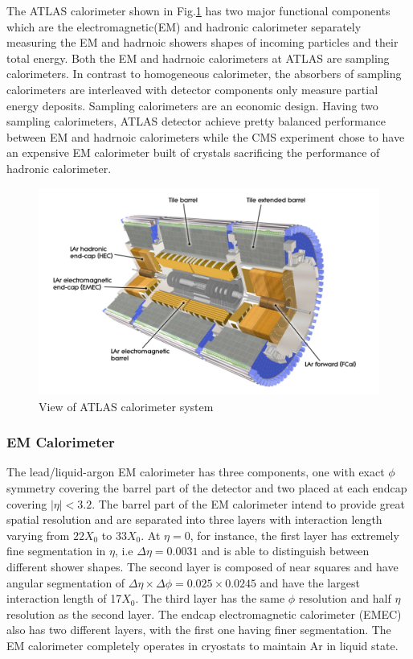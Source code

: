 \label{sec:detector-calo}

The ATLAS calorimeter shown in Fig.\ref{fig:detector-calo} has two major functional components which are the electromagnetic(EM) and hadronic calorimeter separately measuring the EM and hadrnoic showers shapes of incoming particles and their total energy. Both the EM and hadrnoic calorimeters at ATLAS are sampling calorimeters. In contrast to homogeneous calorimeter, the absorbers of sampling calorimeters are interleaved with detector components only measure partial energy deposits. Sampling calorimeters are an economic design. Having two sampling calorimeters, ATLAS detector achieve pretty balanced performance between EM and hadrnoic calorimeters while the CMS experiment chose to have an expensive EM calorimeter built of crystals sacrificing the performance of hadronic calorimeter. 


\begin{figure}[htpb!]
\begin{center}
  \includegraphics[width=0.9\linewidth]{figures/detector/calo}
\caption{View of ATLAS calorimeter system}
\label{fig:detector-calo}
\end{center}
\end{figure}

 
\subsubsection{EM Calorimeter}

The lead/liquid-argon EM calorimeter has three components, one with exact $\phi$ symmetry covering the barrel part of the detector and two placed at each endcap covering $|\eta|<3.2$. The barrel part of the EM calorimeter intend to provide great spatial resolution and are separated into three layers with interaction length varying from $22X_0$ to $33X_0$. At $\eta =0$, for instance, the first layer has extremely fine segmentation in $\eta$, i.e $\Delta \eta = 0.0031$ and is able to distinguish between different shower shapes. The second layer is composed of near squares and have angular segmentation of $\Delta \eta \times \Delta \phi = 0.025 \times 0.0245$ and have the largest interaction length of 17$X_0$. The third layer has the same $\phi$ resolution and half $\eta$ resolution as the second layer. 
The endcap electromagnetic calorimeter (EMEC) also has two different layers, with the first one having finer segmentation. The EM calorimeter completely operates in cryostats to maintain Ar in liquid state.

